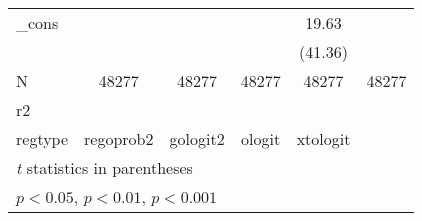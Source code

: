 {\begin{tabular}{l*{5}{c}}
\_cons      &                     &                     &                     &       19.63\sym{***}&                     \\
            &                     &                     &                     &     (41.36)         &                     \\
\hline
N           &       48277         &       48277         &       48277         &       48277         &       48277         \\
r2          &                     &                     &                     &                     &                     \\
regtype     &   regoprob2         &    gologit2         &      ologit         &    xtologit         &                     \\
\hline\hline
\multicolumn{6}{l}{\footnotesize \textit{t} statistics in parentheses}\\
\multicolumn{6}{l}{\footnotesize \sym{*} \(p<0.05\), \sym{**} \(p<0.01\), \sym{***} \(p<0.001\)}\\
\end{tabular}
}
